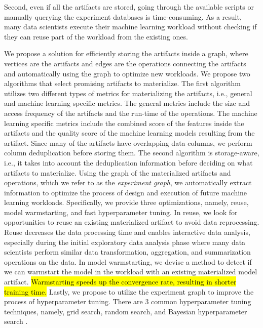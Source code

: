 Second, even if all the artifacts are stored, going through the available scripts or manually querying the experiment databases is time-consuming. 
As a result, many data scientists execute their machine learning workload without checking if they can reuse part of the workload from the existing ones. 

We propose a solution for efficiently storing the artifacts inside a graph, where vertices are the artifacts and edges are the operations connecting the artifacts and automatically using the graph to optimize new workloads.
We propose two algorithms that select promising artifacts to materialize.
The first algorithm utilizes two different types of metrics for materializing the artifacts, i.e., general and machine learning specific metrics.
The general metrics include the size and access frequency of the artifacts and the run-time of the operations.
The machine learning specific metrics include the combined score of the features inside the artifacts and the quality score of the machine learning models resulting from the artifact.
Since many of the artifacts have overlapping data columns, we perform column deduplication before storing them.
The second algorithm is storage-aware, i.e., it takes into account the deduplication information before deciding on what artifacts to materialize.
Using the graph of the materialized artifacts and operations, which we refer to as the \textit{experiment graph}, we automatically extract information to optimize the process of design and execution of future machine learning workloads.
Specifically, we provide three optimizations, namely, reuse, model warmstarting, and fast hyperparameter tuning.
In reuse, we look for opportunities to reuse an existing materialized artifact to avoid data reprocessing.
Reuse decreases the data processing time and enables interactive data analysis, especially during the initial exploratory data analysis phase where many data scientists perform similar data transformation, aggregation, and summarization operations on the data.
In model warmstarting, we devise a method to detect if we can warmstart the model in the workload with an existing materialized model artifact.
\hl{Warmstarting speeds up the convergence rate, resulting in shorter training time.} %
Lastly, we propose to utilize the experiment graph to improve the process of hyperparameter tuning.
There are 3 common hyperparameter tuning techniques, namely, grid search, random search, and Bayesian hyperparameter search \cite{hutter2011sequential,snoek2012practical}.
